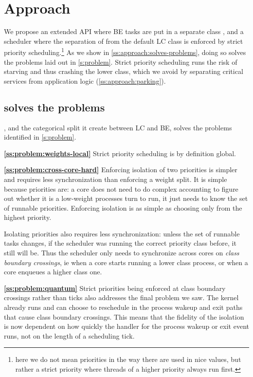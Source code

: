 \section{Approach}\label{s:approach}

We propose an extended \cgroups{} API where BE tasks are put in a separate class
\beclass{}, and a scheduler where the separation of \beclass{} from the default
LC class is enforced by strict priority scheduling.\footnote{here we do not mean
priorities in the way there are used in nice values, but rather a strict
priority where threads of a higher priority always run first.} As we show in
\autoref{ss:approach:solves-problems}, doing so solves the problems laid out in
\autoref{s:problem}. Strict priority scheduling runs the risk of starving and
thus crashing the lower class, which we avoid by separating critical
services from application logic
(\autoref{ss:approach:parking}).

\subsection{\beclass{} solves the problems}\label{ss:approach:solves-problems}

\beclass{}, and the categorical split it create between LC and BE, solves the
problems identified in \autoref{s:problem}.

\textbf{\autoref{ss:problem:weights-local}} Strict priority scheduling is by
definition global.

\textbf{\autoref{ss:problem:cross-core-hard}} Enforcing isolation of two
priorities is simpler and requires less synchronization than enforcing a weight
split. It is simple because priorities are: a core does not need to do complex
accounting to figure out whether it is a low-weight processes turn to run, it
just needs to know the set of runnable priorities. Enforcing isolation is as
simple as choosing only from the highest priority.

Isolating priorities also requires less synchronization: unless the set of
runnable tasks changes, if the scheduler was running the correct priority class
before, it still will be. Thus the scheduler only needs to synchronize across
cores on \textit{class boundary crossings}, ie when a core starts running a
lower class process, or when a core enqueues a higher class one. 

\textbf{\autoref{ss:problem:quantum}} Strict priorities being enforced at class
boundary crossings rather than ticks also addresses the final problem we saw.
The kernel already runs and can choose to reschedule in the process wakeup and
exit paths that cause class boundary crossings. This means that the fidelity of
the isolation is now dependent on how quickly the handler for the process wakeup
or exit event runs, not on the length of a scheduling tick.


